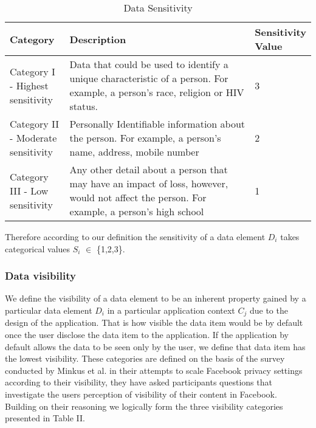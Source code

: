 \documentclass[10pt]{article}
\begin{document}
\begin{center}
\begin{table}[htbp]
\caption{Data Sensitivity}
\begin{center}
\begin{adjustbox}{width=0.5\textwidth} 
\begin{tabular}{|p{0.2\linewidth}|p{0.7\linewidth}|p{0.1\linewidth}|} 
\hline
Category & Description & Sensitivity Value \\
\hline
Category I - Highest sensitivity & Data that could be used to identify a unique characteristic of a person. For example, a person's race, religion or HIV status. & 3 \\
\hline
Category II - Moderate sensitivity & Personally Identifiable information about the person. For example, a person's name, address, mobile number & 2 \\
\hline
Category III - Low sensitivity & Any other detail about a person that may have an impact of loss, however, would not affect the person. For example, a person's high school & 1 \\
\hline
\end{tabular}
\end{adjustbox}
\end{center}
\end{table}
\end{center} 

Therefore according to our definition the sensitivity of a data element \textit {$D_i$} takes categorical values \textit {$S_i$} $\in$ \{1,2,3\}.

\subsubsection {Data visibility} We define the visibility of a data element to be an inherent property gained by a particular data element \textit{$D_i$} in a particular application context \textit{$C_j$} due to the design of the application. That is how visible the data item would be by default once the user disclose the data item to the application. If the application by default allows the data to be seen only by the user, we define that data item has the lowest visibility. These categories are defined on the basis of the survey conducted by Minkus et al. \cite{minkus2014scale} in their attempts to scale Facebook privacy settings according to their visibility, they have asked participants questions that investigate the users perception of visibility of their content in Facebook. Building on their reasoning we logically form the three visibility categories presented in Table II.
\end{document}
